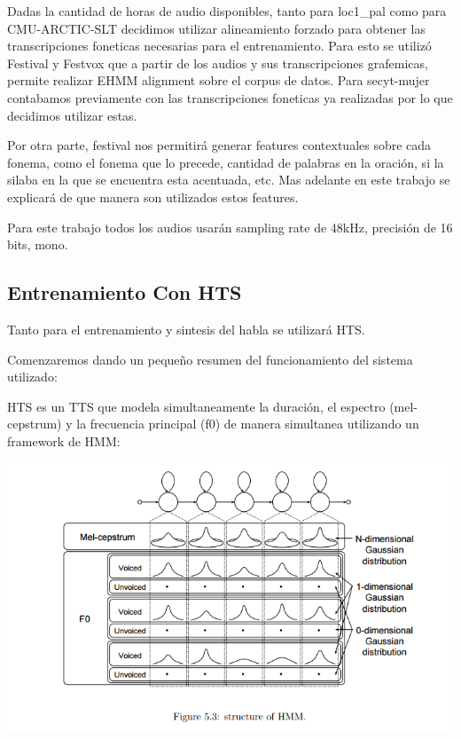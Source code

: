 Dadas la cantidad de horas de audio disponibles, tanto para loc1\_pal como para CMU-ARCTIC-SLT decidimos utilizar alineamiento forzado para obtener las transcripciones foneticas necesarias para el entrenamiento. Para esto se utilizó Festival y Festvox que a partir de los audios y sus transcripciones grafemicas, permite realizar EHMM alignment sobre el corpus de datos. Para secyt-mujer contabamos previamente con las transcripciones foneticas ya realizadas por lo que decidimos utilizar estas. 


Por otra parte, festival nos permitirá generar features contextuales sobre cada fonema, como el fonema que lo precede, cantidad de palabras en la oración, si la silaba en la que se encuentra esta acentuada, etc. Mas adelante en este trabajo se explicará de que manera son utilizados estos features.


Para este trabajo todos los audios usarán sampling rate de 48kHz, precisión de 16 bits, mono.



\subsection{Entrenamiento Con HTS}

Tanto para el entrenamiento y sintesis del habla se utilizará HTS.


Comenzaremos dando un pequeño resumen del funcionamiento del sistema utilizado:


HTS es un TTS que modela simultaneamente la duración, el espectro (mel-cepstrum) y la frecuencia principal (f0) de manera simultanea utilizando un framework de HMM:

\includegraphics[scale=0.5]{imagenes/hmm.png}


